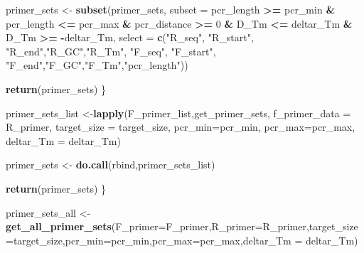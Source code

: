 \documentclass[
]{article}
\newenvironment{Shaded}{\begin{snugshade}}{\end{snugshade}}
\newcommand{\AttributeTok}[1]{\textcolor[rgb]{0.13,0.29,0.53}{#1}}
\newcommand{\DecValTok}[1]{\textcolor[rgb]{0.00,0.00,0.81}{#1}}
\newcommand{\FunctionTok}[1]{\textcolor[rgb]{0.13,0.29,0.53}{\textbf{#1}}}
\newcommand{\NormalTok}[1]{#1}
\newcommand{\OtherTok}[1]{\textcolor[rgb]{0.56,0.35,0.01}{#1}}
\newcommand{\SpecialCharTok}[1]{\textcolor[rgb]{0.81,0.36,0.00}{\textbf{#1}}}
\newcommand{\StringTok}[1]{\textcolor[rgb]{0.31,0.60,0.02}{#1}}
\begin{document}
\begin{Shaded}
\begin{Highlighting}[]
\NormalTok{      primer\_sets }\OtherTok{\textless{}{-}} \FunctionTok{subset}\NormalTok{(primer\_sets, }
                              \AttributeTok{subset =}\NormalTok{ pcr\_length }\SpecialCharTok{\textgreater{}=}\NormalTok{ pcr\_min}
                            \SpecialCharTok{\&}\NormalTok{ pcr\_length }\SpecialCharTok{\textless{}=}\NormalTok{ pcr\_max }
                            \SpecialCharTok{\&}\NormalTok{ pcr\_distance }\SpecialCharTok{\textgreater{}=} \DecValTok{0} 
                            \SpecialCharTok{\&}\NormalTok{ D\_Tm }\SpecialCharTok{\textless{}=}\NormalTok{ deltar\_Tm }
                            \SpecialCharTok{\&}\NormalTok{ D\_Tm }\SpecialCharTok{\textgreater{}=} \SpecialCharTok{{-}}\NormalTok{deltar\_Tm,}
                              \AttributeTok{select =} \FunctionTok{c}\NormalTok{(}\StringTok{"R\_seq"}\NormalTok{, }\StringTok{"R\_start"}\NormalTok{, }\StringTok{"R\_end"}\NormalTok{,}\StringTok{"R\_GC"}\NormalTok{,}\StringTok{"R\_Tm"}\NormalTok{, }\StringTok{"F\_seq"}\NormalTok{, }\StringTok{"F\_start"}\NormalTok{, }\StringTok{"F\_end"}\NormalTok{,}\StringTok{"F\_GC"}\NormalTok{,}\StringTok{"F\_Tm"}\NormalTok{,}\StringTok{"pcr\_length"}\NormalTok{))}
      
      \FunctionTok{return}\NormalTok{(primer\_sets)}
\NormalTok{  \}}
  
\NormalTok{  primer\_sets\_list }\OtherTok{\textless{}{-}}\FunctionTok{lapply}\NormalTok{(F\_primer\_list,get\_primer\_sets,}
                            \AttributeTok{f\_primer\_data =}\NormalTok{ R\_primer,}
                            \AttributeTok{target\_size =}\NormalTok{ target\_size,}
                            \AttributeTok{pcr\_min=}\NormalTok{pcr\_min,}
                            \AttributeTok{pcr\_max=}\NormalTok{pcr\_max,}
                            \AttributeTok{deltar\_Tm =}\NormalTok{ deltar\_Tm)}
  
\NormalTok{  primer\_sets }\OtherTok{\textless{}{-}} \FunctionTok{do.call}\NormalTok{(rbind,primer\_sets\_list)}
  
  \FunctionTok{return}\NormalTok{(primer\_sets)}
\NormalTok{\}}

\NormalTok{primer\_sets\_all }\OtherTok{\textless{}{-}} \FunctionTok{get\_all\_primer\_sets}\NormalTok{(}\AttributeTok{F\_primer=}\NormalTok{F\_primer,}\AttributeTok{R\_primer=}\NormalTok{R\_primer,}\AttributeTok{target\_size=}\NormalTok{target\_size,}\AttributeTok{pcr\_min=}\NormalTok{pcr\_min,}\AttributeTok{pcr\_max=}\NormalTok{pcr\_max,}\AttributeTok{deltar\_Tm =}\NormalTok{ deltar\_Tm)}


\end{Highlighting}
\end{Shaded}
\end{document}

